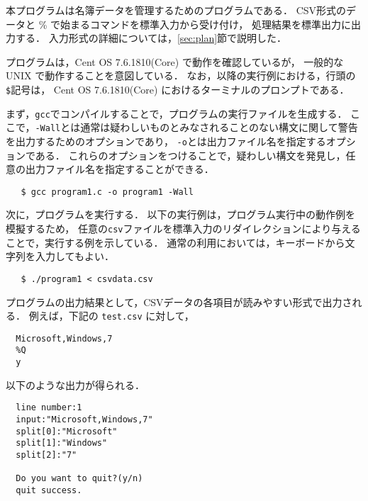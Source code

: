 本プログラムは名簿データを管理するためのプログラムである．
CSV形式のデータと \% で始まるコマンドを標準入力から受け付け，
処理結果を標準出力に出力する．
入力形式の詳細については，\ref{sec:plan}節で説明した．

プログラムは，Cent OS 7.6.1810(Core) で動作を確認しているが，
一般的な UNIX で動作することを意図している．
なお，以降の実行例における，行頭の\verb|$|記号は，
Cent OS 7.6.1810(Core) におけるターミナルのプロンプトである．

まず，\verb|gcc|でコンパイルすることで，プログラムの実行ファイルを生成する．
ここで，\verb|-Wall|とは通常は疑わしいものとみなされることのない構文に関して警告を出力するためのオプションであり，
\verb|-o|とは出力ファイル名を指定するオプションである．
これらのオプションをつけることで，疑わしい構文を発見し，任意の出力ファイル名を指定することができる．

{\fontsize{10pt}{11pt} \selectfont
 \begin{verbatim}
   $ gcc program1.c -o program1 -Wall
 \end{verbatim}
}

次に，プログラムを実行する．
以下の実行例は，プログラム実行中の動作例を模擬するため，
任意の\verb|csv|ファイルを標準入力のリダイレクションにより与えることで，実行する例を示している\cite{www:label1}．
通常の利用においては，キーボードから文字列を入力してもよい．

{\fontsize{10pt}{11pt} \selectfont
 \begin{verbatim}
   $ ./program1 < csvdata.csv
 \end{verbatim}
}

プログラムの出力結果として，CSVデータの各項目が読みやすい形式で出力される．
例えば，下記の \verb|test.csv| に対して，

{\fontsize{10pt}{11pt} \selectfont
 \begin{verbatim}
  Microsoft,Windows,7
  %Q
  y
 \end{verbatim}
}

\noindent %
以下のような出力が得られる．

{\fontsize{10pt}{11pt} \selectfont
 \begin{verbatim}
  line number:1
  input:"Microsoft,Windows,7"
  split[0]:"Microsoft"
  split[1]:"Windows"
  split[2]:"7"

  Do you want to quit?(y/n)
  quit success.
 \end{verbatim}
}

